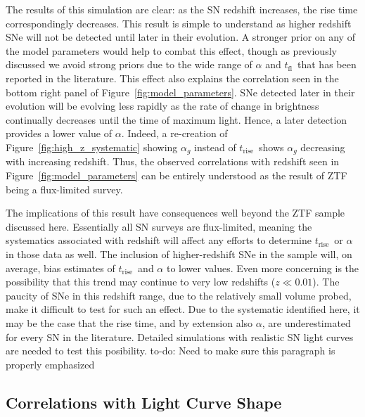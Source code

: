\documentclass[twocolumn]{./aastex63}
\newcommand{\todo}[1]{{\color{magenta} to-do: {#1}}}
\newcommand{\tfl}{$t_\mathrm{fl}$}
\newcommand{\trise}{$t_\mathrm{rise}$}
\begin{document}
The results of this simulation are clear: as the SN redshift increases, the
rise time correspondingly decreases. This result is simple to understand as
higher redshift SNe will not be detected until later in their evolution. A
stronger prior on any of the model parameters would help to combat this
effect, though as previously discussed we avoid strong priors due to the wide
range of $\alpha$ and \tfl\ that has been reported in the literature. This
effect also explains the correlation seen in the bottom right panel of
Figure~\ref{fig:model_parameters}. SNe detected later in their evolution will
be evolving less rapidly as the rate of change in brightness continually
decreases until the time of maximum light. Hence, a later detection provides a
lower value of $\alpha$. Indeed, a re-creation of
Figure~\ref{fig:high_z_systematic} showing $\alpha_g$ instead of \trise\ shows
$\alpha_g$ decreasing with increasing redshift. Thus, the observed
correlations with redshift seen in Figure~\ref{fig:model_parameters} can be
entirely understood as the result of ZTF being a flux-limited survey.

The implications of this result have consequences well beyond the ZTF sample
discussed here. Essentially all SN surveys are flux-limited, meaning the
systematics associated with redshift will affect any efforts to determine
\trise\ or $\alpha$ in those data as well. The inclusion of higher-redshift
SNe in the sample will, on average, bias estimates of \trise\ and $\alpha$ to
lower values. Even more concerning is the possibility that this trend may
continue to very low redshifts ($z \ll 0.01$). The paucity of SNe in this
redshift range, due to the relatively small volume probed, make it difficult
to test for such an effect. Due to the systematic identified here, it may be
the case that the rise time, and by extension also $\alpha$, are
underestimated for every SN in the literature. Detailed simulations with
realistic SN light curves are needed to test this posibility.
\todo{Need to make sure this paragraph  is properly emphasized}

\subsection{Correlations with Light Curve Shape}
\end{document}
